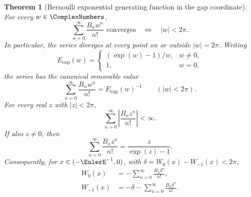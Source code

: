 \documentclass[11pt,oneside]{article}
\newtheorem{theorem}{Theorem}[section]
\theoremstyle{definition}
\theoremstyle{remark}
\begin{document}
\begin{theorem}[Bernoulli exponential generating function in the gap coordinate]
\label{thm:lambert-gap-bernoulli-series}
For every \(w\in\ComplexNumbers\),
\[
 \sum_{n=0}^{\infty}\frac{B_nw^n}{n!}\text{ converges}
 \quad\Longleftrightarrow\quad \lvert w\rvert<2\pi.
\]
In particular, the series diverges at every point on or outside
\(\lvert w\rvert=2\pi\).
Writing
\[
 E_{\exp}(w)=
 \begin{cases}
  (\exp(w)-1)/w,&w\ne0,\\
  1,&w=0,
 \end{cases}
\]
the series has the canonical removable value
\[
 \sum_{n=0}^{\infty}\frac{B_nw^n}{n!}=E_{\exp}(w)^{-1}
 \qquad (\lvert w\rvert<2\pi).
\]
For every real \(z\) with \(\lvert z\rvert<2\pi\),
\begin{equation}
 \sum_{n=0}^{\infty}
 \left\lvert\frac{B_nz^n}{n!}\right\rvert<\infty.
 \label{eq:bernoulli-egf-absolute}
\end{equation}
If also \(z\ne0\), then
\begin{equation}
 \sum_{n=0}^{\infty}\frac{B_nz^n}{n!}
   =\frac{z}{\exp(z)-1}.                                  \label{eq:bernoulli-egf}
\end{equation}
Consequently, for \(x\in(-\EulerE^{-1},0)\), with
\(\delta=W_0(x)-W_{-1}(x)<2\pi\),
\begin{align}
 W_0(x)&=-\sum_{n=0}^{\infty}\frac{B_n\delta^n}{n!},
                                                               \label{eq:lambert-principal-bernoulli}\\
 W_{-1}(x)&=-\delta-
       \sum_{n=0}^{\infty}\frac{B_n\delta^n}{n!}.
                                                               \label{eq:lambert-lower-bernoulli}
\end{align}
\end{theorem}
\end{document}
